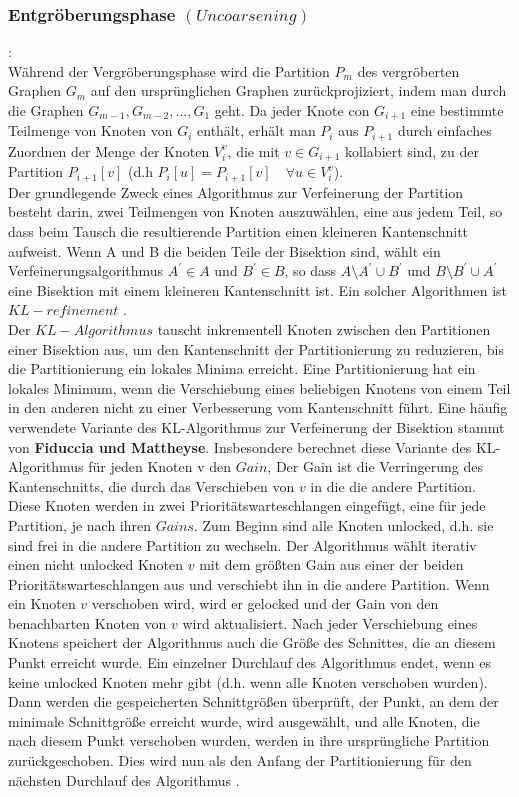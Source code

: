 \documentclass[runningheads]{llncs}
\begin{document}
\subsubsection{Entgröberungsphase $(Uncoarsening)$}:\\
Während der Vergröberungsphase wird die Partition $P_m$ des vergröberten Graphen $G_m$ auf den ursprünglichen Graphen zurückprojiziert, indem man durch die Graphen $G_{m-1}, G_{m-2}, \ldots, G_1$ geht. Da jeder Knote con $G_{i+1}$ eine bestimmte Teilmenge von Knoten von $G_i$ enthält, erhält man $P_i$ aus $P_{i+1}$ durch einfaches Zuordnen der Menge der Knoten $V_{i}^{v}$, die mit $v \in G_{i+1}$ kollabiert sind, zu der Partition $P_{i+1}[v]$ (d.h $P_{i}[u] = P_{i+1}[v] \quad \forall u \in V_{i}^{v}$). \\
Der grundlegende Zweck eines Algorithmus zur Verfeinerung der Partition
besteht darin, zwei Teilmengen von Knoten auszuwählen, eine aus jedem Teil, so dass beim Tausch die
resultierende Partition einen kleineren Kantenschnitt aufweist. Wenn A und B die beiden Teile 
der Bisektion sind, wählt ein Verfeinerungsalgorithmus $A^{'} \in A$ und $B^{'} \in B$, so dass $A \setminus A^{'} \cup B^{'}$ und $B \setminus B^{'} \cup A^{'}$ eine Bisektion mit einem kleineren Kantenschnitt ist. Ein solcher Algorithmen ist $KL-refinement$ \cite{karypis1998fast}.\\
Der $KL-Algorithmus$ tauscht inkrementell Knoten zwischen den Partitionen einer Bisektion aus, um
den Kantenschnitt der Partitionierung zu reduzieren, bis die Partitionierung ein lokales Minima erreicht. Eine Partitionierung hat ein lokales Minimum, wenn die Verschiebung eines beliebigen Knotens von einem Teil in den anderen nicht zu einer Verbesserung
vom Kantenschnitt führt.  Eine
häufig verwendete Variante des KL-Algorithmus zur Verfeinerung der Bisektion stammt von \textbf{Fiduccia und Mattheyse}. Insbesondere berechnet diese Variante des KL-Algorithmus für jeden Knoten v
den $Gain$, Der Gain ist die Verringerung des Kantenschnitts, die durch das Verschieben von $v$ in die
die andere Partition. Diese Knoten werden in zwei Prioritätswarteschlangen eingefügt, eine für jede
Partition, je nach ihren $Gains$. Zum Beginn sind alle Knoten unlocked, d.h. sie sind frei
in die andere Partition zu wechseln. Der Algorithmus wählt iterativ einen nicht unlocked Knoten $v$
mit dem größten Gain aus einer der beiden Prioritätswarteschlangen aus und verschiebt ihn in die andere
Partition. Wenn ein Knoten $v$ verschoben wird, wird er gelocked und der Gain von den benachbarten Knoten von $v$ wird aktualisiert. Nach jeder Verschiebung eines Knotens speichert der Algorithmus auch die Größe des Schnittes, die an diesem Punkt erreicht wurde.  Ein einzelner Durchlauf des Algorithmus endet, wenn es keine unlocked Knoten mehr gibt (d.h. wenn alle
Knoten verschoben wurden). Dann werden die gespeicherten Schnittgrößen überprüft, der Punkt, an dem der
minimale Schnittgröße erreicht wurde, wird ausgewählt, und alle Knoten, die nach diesem Punkt verschoben wurden,
werden in ihre ursprüngliche Partition zurückgeschoben. Dies wird nun als den Anfang der Partitionierung für
den nächsten Durchlauf des Algorithmus \cite{jhala2006practical}. 
\end{document}
